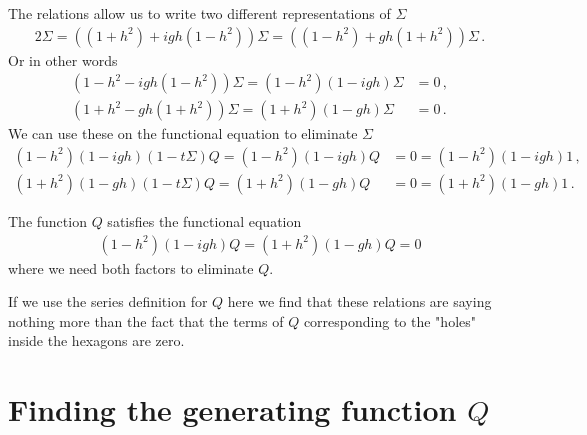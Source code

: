 The relations allow us to write two different representations of $\Sigma$
\begin{align}
	2\Sigma = ((1+h^2) + igh(1-h^2))\Sigma =( (1-h^2)+gh(1+h^2))\Sigma\,.
\end{align}
Or in other words
\begin{align}
	(1-h^2-igh(1-h^2))\Sigma = (1-h^2)(1-igh)\Sigma &= 0\,,\\
	(1+h^2-gh(1+h^2))\Sigma = (1+h^2)(1-gh)\Sigma &= 0\,.
\end{align}
We can use these on the functional equation to eliminate $\Sigma$
\begin{align}
	(1-h^2)(1-igh)(1-t\Sigma)Q = (1-h^2)(1-igh)Q &= 0 = (1-h^2)(1-igh)1\,,\\
	 (1+h^2)(1-gh)(1-t\Sigma)Q = (1+h^2)(1-gh)Q &= 0 =  (1+h^2)(1-gh)1\,.
\end{align}
\begin{prop} The function $Q$ satisfies the functional equation
\begin{align}
	(1-h^2)(1-igh)Q = (1+h^2)(1-gh)Q = 0
\end{align}
where we need both factors to eliminate $Q$.
\end{prop}
If we use the series definition for $Q$ here we find that these relations are saying nothing more than the fact that the terms of $Q$ corresponding to the "holes" inside the hexagons are zero.

\section{Finding the generating function $Q$}

